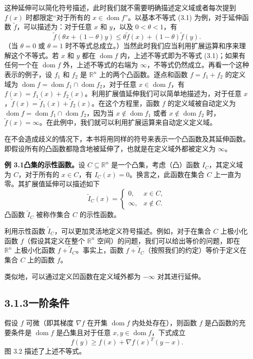 \documentclass[UTF8, 12pt, fontset=fandol, oneside]{ctexart}
\DeclareMathOperator{\dom}{dom}
\begin{document}
这种延伸可以简化符号描述，此时我们就不需要明确描述定义域或者每次提到 $f(x)$ 时都限定“对于所有的 $x\in\dom f$”。以基本不等式 (3.1) 为例，对于延伸函数 $\tilde f$，可以描述为：对于任意 $x$ 和 $y$，以及 $0<\theta<1$，有
\[
\tilde f(\theta x+(1-\theta)y)\leq \theta \tilde f(x)+(1-\theta)\tilde f(y).
\]
（当 $\theta=0$ 或 $\theta=1$ 时不等式总成立。）当然此时我们应当利用扩展运算和序来理解这个不等式。若 $x$ 和 $y$ 都在 $\dom f$ 内，上述不等式即为不等式 (3.1)；如果有任何一个在 $\dom f$ 外，上述不等式的右端为 $\infty$，不等式仍然成立。再看一个这种表示的例子，设 $f_1$ 和 $f_2$ 是 $\mathbb{R}^n$ 上的两个凸函数。逐点和函数 $f=f_1+f_2$ 的定义域为 $\dom f=\dom f_1\cap\dom f_2$，对于任意 $x\in\dom f$，有 $f(x)=f_1(x)+f_2(x)$。利用扩展值延伸我们可以简单地描述为，对于任意 $x$，$\tilde f(x)=\tilde f_1(x)+\tilde f_2(x)$。在这个方程里，函数 $f$ 的定义域被自动定义为 $\dom f=\dom f_1\cap\dom f_2$，因为当 $x\notin\dom f_1$ 或者 $x\notin\dom f_2$ 时，$\tilde f(x)=\infty$。在此例中，我们就可以利用扩展运算来自动定义定义域。

在不会造成歧义的情况下，本书将用同样的符号来表示一个凸函数及其延伸函数。即假设所有的凸函数都隐含地被延伸了，也就是在定义域外都被定义为 $\infty$。

\noindent\textbf{例 3.1\quad 凸集的示性函数。}\quad 设 $C\subseteq\mathbb{R}^n$ 是一个凸集，考虑（凸）函数 $I_C$，其定义域为 $C$，对于所有的 $x\in C$，有 $I_C(x)=0$。换言之，此函数在集合 $C$ 上一直为零。其扩展值延伸可以描述如下
\[
\tilde I_C(x)=
\begin{cases}
0, & x\in C,\\
\infty, & x\notin C.
\end{cases}
\]
凸函数 $\tilde I_C$ 被称作集合 $C$ 的示性函数。

利用示性函数 $\tilde I_C$，可以更加灵活地定义符号描述。例如，对于在集合 $C$ 上极小化函数 $f$（假设其定义在整个 $\mathbb{R}^n$ 空间）的问题，我们可以给出等价的问题，即在 $\mathbb{R}^n$ 上极小化函数 $f+\tilde I_C$。事实上，函数 $f+\tilde I_C$（按照我们的约定）等价于定义在集合 $C$ 上的函数 $f$。

类似地，可以通过定义凹函数在定义域外都为 $-\infty$ 对其进行延伸。

\subsection*{3.1.3\quad 一阶条件}

假设 $f$ 可微（即其梯度 $\nabla f$ 在开集 $\dom f$ 内处处存在），则函数 $f$ 是凸函数的充要条件是 $\dom f$ 是凸集且对于任意 $x,y\in\dom f$，下式成立
\begin{equation}
f(y)\geq f(x)+\nabla f(x)^T(y-x).
\tag{3.2}
\end{equation}
图 3.2 描述了上述不等式。
\end{document}
